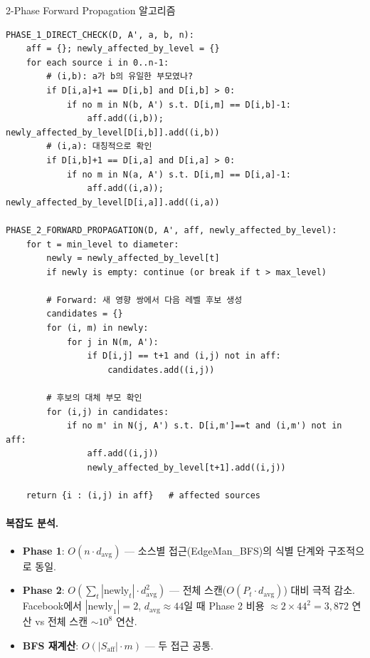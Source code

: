 \documentclass[11pt,a4paper]{article}
\begin{document}
\begin{mathbox}{2-Phase Forward Propagation 알고리즘}
\begin{verbatim}
PHASE_1_DIRECT_CHECK(D, A', a, b, n):
    aff = {}; newly_affected_by_level = {}
    for each source i in 0..n-1:
        # (i,b): a가 b의 유일한 부모였나?
        if D[i,a]+1 == D[i,b] and D[i,b] > 0:
            if no m in N(b, A') s.t. D[i,m] == D[i,b]-1:
                aff.add((i,b));  newly_affected_by_level[D[i,b]].add((i,b))
        # (i,a): 대칭적으로 확인
        if D[i,b]+1 == D[i,a] and D[i,a] > 0:
            if no m in N(a, A') s.t. D[i,m] == D[i,a]-1:
                aff.add((i,a));  newly_affected_by_level[D[i,a]].add((i,a))

PHASE_2_FORWARD_PROPAGATION(D, A', aff, newly_affected_by_level):
    for t = min_level to diameter:
        newly = newly_affected_by_level[t]
        if newly is empty: continue (or break if t > max_level)

        # Forward: 새 영향 쌍에서 다음 레벨 후보 생성
        candidates = {}
        for (i, m) in newly:
            for j in N(m, A'):
                if D[i,j] == t+1 and (i,j) not in aff:
                    candidates.add((i,j))

        # 후보의 대체 부모 확인
        for (i,j) in candidates:
            if no m' in N(j, A') s.t. D[i,m']==t and (i,m') not in aff:
                aff.add((i,j))
                newly_affected_by_level[t+1].add((i,j))

    return {i : (i,j) in aff}   # affected sources
\end{verbatim}
\end{mathbox}

\paragraph{복잡도 분석.}
\begin{itemize}[leftmargin=1.4em]
  \item \textbf{Phase 1}: $O(n \cdot d_{\text{avg}})$ --- 소스별 접근(EdgeMan\_BFS)의 식별 단계와 구조적으로 동일.
  \item \textbf{Phase 2}: $O(\sum_t |\text{newly}_t| \cdot d_{\text{avg}}^2)$ --- 전체 스캔($O(P_t \cdot d_{\text{avg}})$) 대비 극적 감소. Facebook에서 $|\text{newly}_1| = 2$, $d_{\text{avg}} \approx 44$일 때 Phase 2 비용 $\approx 2 \times 44^2 = 3{,}872$ 연산 vs 전체 스캔 $\sim 10^8$ 연산.
  \item \textbf{BFS 재계산}: $O(|S_{\text{aff}}| \cdot m)$ --- 두 접근 공통.
\end{itemize}
\end{document}
